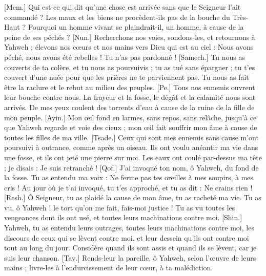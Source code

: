 \begin{multicols}{2}
[Mem.] Qui est-ce qui dit qu'une chose est arrivée sans que le Seigneur l'ait commandé ?
Les maux et les biens ne procèdent-ils pas de la bouche du Très-Haut ?
Pourquoi un homme vivant se plaindrait-il, un homme, à cause de la peine de ses péchés ?
[Nun.] Recherchons nos voies, sondons-les, et retournons à Yahweh ;
élevons nos cœurs et nos mains vers Dieu qui est au ciel :
Nous avons péché, nous avons été rebelles ! Tu n'as pas pardonné !
[Samech.] Tu nous as couverts de ta colère, et tu nous as poursuivis ; tu as tué sans épargner ;
tu t'es couvert d'une nuée pour que les prières ne te parviennent pas.
Tu nous as fait être la raclure et le rebut au milieu des peuples.
[Pe.] Tous nos ennemis ouvrent leur bouche contre nous.
La frayeur et la fosse, le dégât et la calamité nous sont arrivés.
De mes yeux coulent des torrents d'eau à cause de la ruine de la fille de mon peuple.
[Ayin.] Mon œil fond en larmes, sans repos, sans relâche,
jusqu'à ce que Yahweh regarde et voie des cieux ;
mon œil fait souffrir mon âme à cause de toutes les filles de ma ville.
[Tsade.] Ceux qui sont mes ennemis sans cause m'ont poursuivi à outrance, comme après un oiseau.
Ils ont voulu anéantir ma vie dans une fosse, et ils ont jeté une pierre sur moi.
Les eaux ont coulé par-dessus ma tête ; je disais : Je suis retranché !
[Qof.] J'ai invoqué ton nom, ô Yahweh, du fond de la fosse.
Tu as entendu ma voix : Ne ferme pas tes oreilles à mes soupirs, à mes cris !
Au jour où je t'ai invoqué, tu t'es approché, et tu as dit : Ne crains rien !
[Resh.] Ô Seigneur, tu as plaidé la cause de mon âme, tu as racheté ma vie.
Tu as vu, ô Yahweh ! le tort qu'on me fait, fais-moi justice !
Tu as vu toutes les vengeances dont ils ont usé, et toutes leurs machinations contre moi.
[Shin.] Yahweh, tu as entendu leurs outrages, toutes leurs machinations contre moi,
les discours de ceux qui se lèvent contre moi, et leur dessein qu'ils ont contre moi tout au long du jour.
Considère quand ils sont assis et quand ils se lèvent, car je suis leur chanson.
[Tav.] Rends-leur la pareille, ô Yahweh, selon l'œuvre de leurs mains ;
livre-les à l'endurcissement de leur cœur, à ta malédiction.

\end{multicols}
